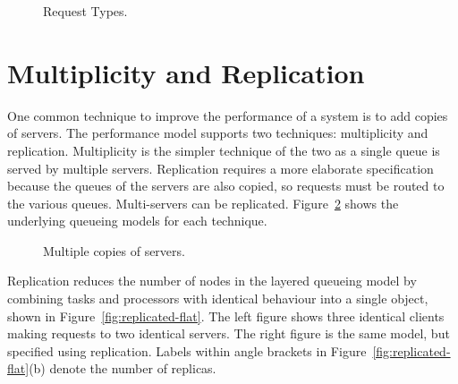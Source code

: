 \begin{figure}[htbp]
  \centering
  \caption{Request Types.}
  \label{fig:request-types}
\end{figure}

\section{Multiplicity and Replication}
\label{sec:replication}\label{sec:multiplicity}

One common technique to improve the performance of a system is to add
copies of servers.  The performance model supports two techniques:
multiplicity and
replication.  Multiplicity is the simpler
technique of the two as a single queue is served by multiple servers.
Replication requires a more elaborate specification because the queues
of the servers are also copied, so requests must be routed to the
various queues.  Multi-servers can be replicated.
Figure~\ref{fig:multiplicity-replication} shows the underlying
queueing models for each technique.

\begin{figure}[htbp]
  \centering
  \caption{Multiple copies of servers.}
  \label{fig:multiplicity-replication}
\end{figure}

Replication reduces the number of nodes in the layered queueing model
by combining tasks and processors with identical behaviour into a
single object, shown in Figure~\ref{fig:replicated-flat}.  The left
figure shows three identical clients making requests to two identical
servers.  The right figure is the same model, but specified using
replication.  Labels within angle brackets in
Figure~\ref{fig:replicated-flat}(b) denote the number of replicas.

